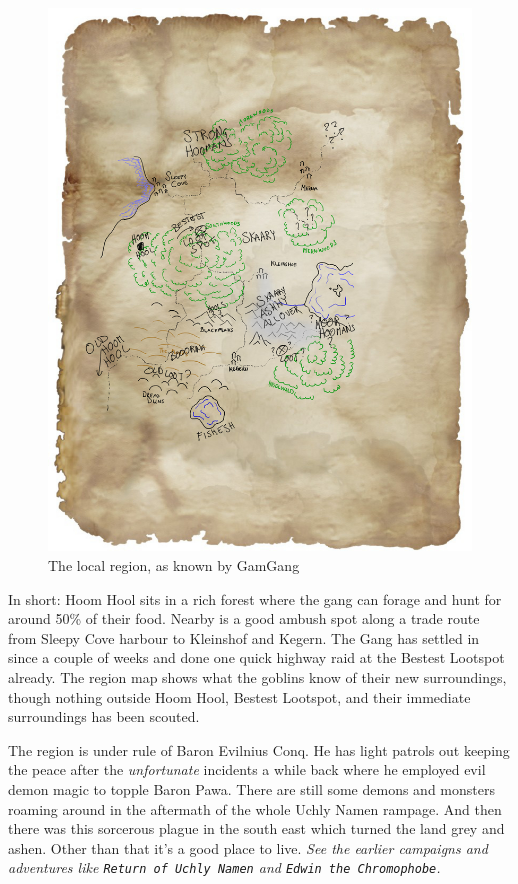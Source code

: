 \begin{figure}[h!]
  \centering
  \includegraphics[width=1.0\textwidth]{fig/region.jpg}
  \caption{The local region, as known by GamGang}
\end{figure}

In short: Hoom Hool sits in a rich forest where the gang can forage and hunt for around 50\% of their food. Nearby is a good ambush spot along a trade route from Sleepy Cove harbour to Kleinshof and Kegern. The Gang has settled in since a couple of weeks and done one quick highway raid at the Bestest Lootspot already. The region map shows what the goblins know of their new surroundings, though nothing outside Hoom Hool, Bestest Lootspot, and their immediate surroundings has been scouted.

The region is under rule of Baron Evilnius Conq. He has light patrols out keeping the peace after the \emph{unfortunate} incidents a while back where he employed evil demon magic to topple Baron Pawa. There are still some demons and monsters roaming around in the aftermath of the whole Uchly Namen rampage. And then there was this sorcerous plague in the south east which turned the land grey and ashen. Other than that it's a good place to live. \textit{See the earlier campaigns and adventures like \texttt{Return of Uchly Namen} and \texttt{Edwin the Chromophobe}.}

